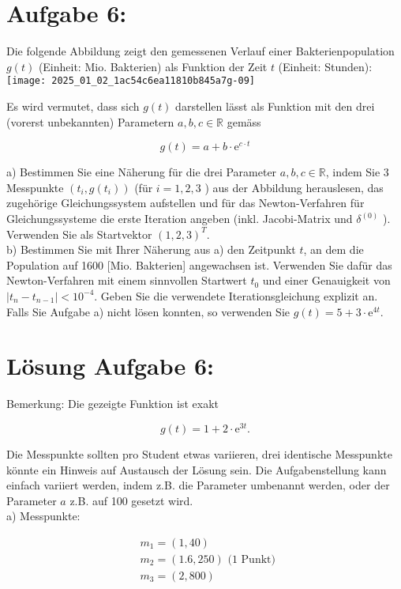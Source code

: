 \documentclass[10pt]{article}
\begin{document}
\section*{Aufgabe 6:}
Die folgende Abbildung zeigt den gemessenen Verlauf einer Bakterienpopulation $g(t)$ (Einheit: Mio. Bakterien) als Funktion der Zeit $t$ (Einheit: Stunden):\\
\texttt{[image: 2025\_01\_02\_1ac54c6ea11810b845a7g-09]}

Es wird vermutet, dass sich $g(t)$ darstellen lässt als Funktion mit den drei (vorerst unbekannten) Parametern $a, b, c \in \mathbb{R}$ gemäss

$$
g(t)=a+b \cdot \mathrm{e}^{c \cdot t}
$$

a) Bestimmen Sie eine Näherung für die drei Parameter $a, b, c \in \mathbb{R}$, indem Sie 3 Messpunkte $\left(t_{i}, g\left(t_{i}\right)\right)$ (für $i=1,2,3$ ) aus der Abbildung herauslesen, das zugehörige Gleichungssystem aufstellen und für das Newton-Verfahren für Gleichungssysteme die erste Iteration angeben (inkl. Jacobi-Matrix und $\delta^{(0)}$ ). Verwenden Sie als Startvektor $(1,2,3)^{T}$.\\
b) Bestimmen Sie mit Ihrer Näherung aus a) den Zeitpunkt $t$, an dem die Population auf 1600 [Mio. Bakterien] angewachsen ist. Verwenden Sie dafür das Newton-Verfahren mit einem sinnvollen Startwert $t_{0}$ und einer Genauigkeit von $\left|t_{n}-t_{n-1}\right|<10^{-4}$. Geben Sie die verwendete Iterationsgleichung explizit an.\\
Falls Sie Aufgabe a) nicht lösen konnten, so verwenden Sie $g(t)=5+3 \cdot \mathrm{e}^{4 t}$.

\section*{Lösung Aufgabe 6:}
Bemerkung: Die gezeigte Funktion ist exakt

$$
g(t)=1+2 \cdot \mathrm{e}^{3 t} .
$$

Die Messpunkte sollten pro Student etwas variieren, drei identische Messpunkte könnte ein Hinweis auf Austausch der Lösung sein. Die Aufgabenstellung kann einfach variiert werden, indem z.B. die Parameter umbenannt werden, oder der Parameter $a$ z.B. auf 100 gesetzt wird.\\
a) Messpunkte:

$$
\begin{aligned}
& m_{1}=(1,40) \\
& m_{2}=(1.6,250) \text { (1 Punkt) } \\
& m_{3}=(2,800)
\end{aligned}
$$
\end{document}
